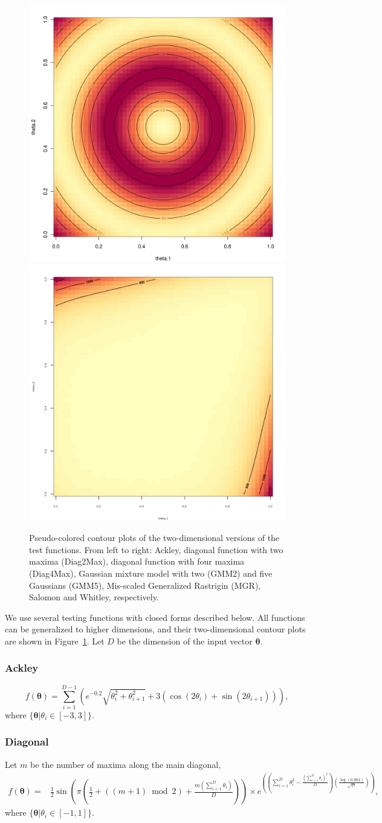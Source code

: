 \begin{figure}[htbp]
\begin{center}
\includegraphics[width=0.24\linewidth]{figs/chap5/Salomon.png}
\includegraphics[width=0.24\linewidth]{figs/chap5/Whitley.png}
\caption{Pseudo-colored contour plots of the two-dimensional versions of the test functions.
%
From left to right: Ackley, diagonal function with two maxima (Diag2Max), diagonal function with four maxima (Diag4Max), Gaussian mixture model with two (GMM2) and five Gaussians (GMM5), Mis-scaled Generalized Rastrigin (MGR), Salomon and Whitley, respectively.}
\label{fig:original}
\end{center}
\end{figure}

We use several testing functions with closed forms described below.
%
All functions can be generalized to higher dimensions, and their two-dimensional contour plots are shown in Figure~\ref{fig:original}.
%
Let $D$ be the dimension of the input vector $\boldsymbol{\theta}$.

\subsubsection{Ackley}
$$
f(\boldsymbol{\theta}) = \sum_{i=1}^{D-1}\left(e^{-0.2}\sqrt{\theta_i^2+\theta_{i+1}^2} + 3(\cos(2\theta_i) + \sin(2\theta_{i+1}))\right),
$$
where $\{\boldsymbol{\theta}|\theta_i\in [-3,3]\}$.

\subsubsection{Diagonal}
Let $m$ be the number of maxima along the main diagonal,
\begin{eqnarray*}
f(\boldsymbol{\theta}) = & \frac{1}{2}\sin\left(\pi\left(\frac{1}{2} + \left((m+1) \bmod{2}\right) + \frac{m\left(\sum_{i=1}^{D}\theta_i\right)}{D}\right)\right)
 \times e^{\left(\left(\sum_{i=1}^{D}\theta_i^2 -\frac{\left(\sum_{i=1}^{D}\theta_i\right)^2}{D}\right)\left(\frac{\log(0.001)}{\sqrt{D}}\right)\right)},
\end{eqnarray*}
where
$\{\boldsymbol{\theta}|\theta_i\in [-1,1]\}$.

